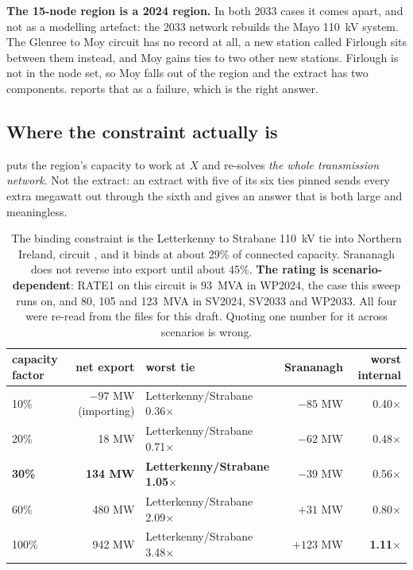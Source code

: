 \documentclass[11pt,a4paper]{article}
\begin{document}
\textbf{The 15-node region is a 2024 region.} In both 2033 cases it comes apart,
and not as a modelling artefact: the 2033 network rebuilds the Mayo 110~kV
system. The Glenree to Moy circuit has no record at all, a new station called
Firlough sits between them instead, and Moy gains ties to two other new
stations. Firlough is not in the node set, so Moy falls out of the region and
the extract has two components.  reports that as a
failure, which is the right answer.

\subsection{Where the constraint actually is}

 puts the region's capacity
to work at $X$ and re-solves \emph{the whole transmission network}. Not the
extract: an extract with five of its six ties pinned sends every extra megawatt
out through the sixth and gives an answer that is both large and meaningless.

\begin{table}[H]\centering\footnotesize
\setlength{\tabcolsep}{4pt}
\begin{tabular}{lrlrr}
\toprule
\textbf{capacity factor} & \textbf{net export} & \textbf{worst tie} &
\textbf{Srananagh} & \textbf{worst internal} \\
\midrule
10\%  & $-97$ MW (importing) & Letterkenny/Strabane 0.36$\times$ & $-85$ MW & 0.40$\times$ \\
20\%  & 18 MW                & Letterkenny/Strabane 0.71$\times$ & $-62$ MW & 0.48$\times$ \\
\rowcolor{surface}
\textbf{30\%} & \textbf{134 MW} & \textbf{Letterkenny/Strabane 1.05$\times$} & $-39$ MW & 0.56$\times$ \\
60\%  & 480 MW               & Letterkenny/Strabane 2.09$\times$ & $+31$ MW & 0.80$\times$ \\
100\% & 942 MW               & Letterkenny/Strabane 3.48$\times$ & $+123$ MW & \textbf{1.11$\times$} \\
\bottomrule
\end{tabular}
\caption{The binding constraint is the Letterkenny to Strabane 110~kV tie into
Northern Ireland, circuit , and it binds at about 29\% of
connected capacity. Srananagh does not reverse into export until about 45\%.
\textbf{The rating is scenario-dependent}: RATE1 on this circuit is 93~MVA in
WP2024, the case this sweep runs on, and 80, 105 and 123~MVA in SV2024, SV2033
and WP2033. All four were re-read from the files for this draft. Quoting one
number for it across scenarios is wrong.}
\label{tab:windy}
\end{table}
\end{document}

